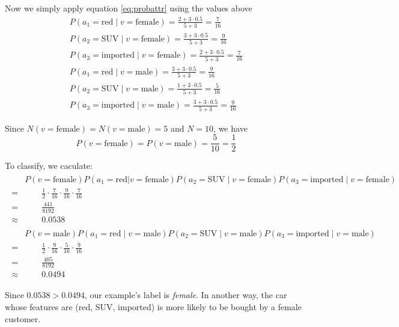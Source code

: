 \documentclass[a4paper]{article}
\begin{document}
		Now we simply apply equation \eqref{eq:probattr} using the values above
		\begin{align*}
			P(a_1=\text{red}\mid v=\text{female})      = \frac{2+3 \cdot 0.5}{5+3} = \frac{7}{16} \\
			P(a_2=\text{SUV}\mid v=\text{female})      = \frac{3+3 \cdot 0.5}{5+3} = \frac{9}{16} \\
			P(a_3=\text{imported}\mid v=\text{female}) = \frac{2+3 \cdot 0.5}{5+3} = \frac{7}{16} \\
			P(a_1=\text{red}\mid v=\text{male})        = \frac{3+3 \cdot 0.5}{5+3} = \frac{9}{16} \\
			P(a_2=\text{SUV}\mid v=\text{male})        = \frac{1+3 \cdot 0.5}{5+3} = \frac{5}{16} \\
			P(a_3=\text{imported}\mid v=\text{male})   = \frac{3+3 \cdot 0.5}{5+3} = \frac{9}{16}
		\end{align*}

		Since $N(v=\text{female})=N(v=\text{male})=5$ and $N=10$, we
		have \[P(v=\text{female}) = P(v=\text{male}) = \frac{5}{10} =
		\frac{1}{2}\]

		To classify, we caculate:
		\begin{gather*}
			\begin{split}
				&P(v=\text{female})P(a_1=\text{red}|v=\text{female})P(a_2=\text{SUV}\mid
				v=\text{female})P(a_3=\text{imported}\mid v=\text{female}) \\
				=&\qquad \frac{1}{2} \cdot \frac{7}{16} \cdot \frac{9}{16} \cdot
				\frac{7}{16} \\
				=&\qquad \frac{441}{8192} \\
				\approx&\qquad 0.0538
			\end{split}
		\end{gather*}
		\begin{gather*}
			\begin{split}
				&P(v=\text{male})P(a_1=\text{red}\mid v=\text{male})P(a_2=\text{SUV}\mid
				v=\text{male})P(a_3=\text{imported}\mid v=\text{male}) \\
				=&\qquad \frac{1}{2} \cdot \frac{9}{16} \cdot \frac{5}{16} \cdot \frac{9}{16}\\
				=&\qquad \frac{405}{8192} \\
				\approx&\qquad 0.0494
			\end{split}
		\end{gather*}

		Since $0.0538 > 0.0494$, our example's label is \textit{female}. In
		another way, the car whose features are (red, SUV, imported)
		is more likely to be bought by a female customer.
\end{document}
